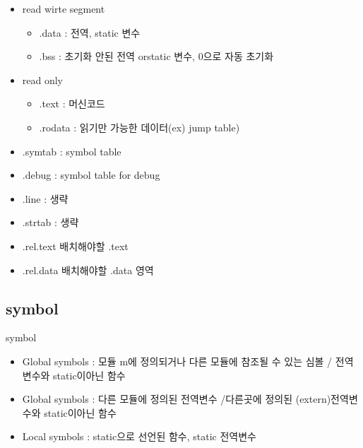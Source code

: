 \documentclass[10pt]{beamer}
\begin{document}
\begin{frame}{}
    \begin{itemize}
            \item read wirte segment
            \begin{itemize}
                \item .data  :  전역, static 변수
                \item .bss : 초기화 안된 전역 orstatic 변수, 0으로 자동 초기화
            \end{itemize}
            \item read only 
            \begin{itemize}
                \item .text : 머신코드
                \item .rodata : 읽기만 가능한 데이터(ex) jump table)
            \end{itemize}

            \item .symtab : symbol table 
            \item .debug : symbol table for debug
            \item .line : 생략
            \item .strtab : 생략
            
            \item .rel.text 배치해야할 .text
            \item .rel.data 배치해야할 .data 영역

    \end{itemize}
\end{frame}    

\subsection{symbol}


\begin{frame}{symbol}
    \begin{itemize}
        \item Global symbols : 모듈 m에 정의되거나 다른 모듈에 참조될 수 있는 심볼 / 전역변수와 static이아닌 함수
        \item Global symbols : 다른 모듈에 정의된 전역변수 
        /다른곳에 정의된 (extern)전역변수와 static이아닌 함수
        \item Local symbols : static으로 선언된 함수, static 전역변수
    \end{itemize}
\end{frame}
\end{document}
